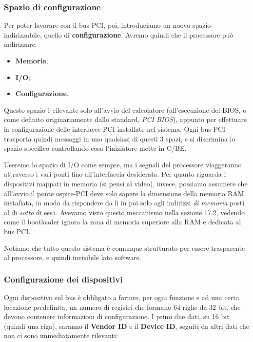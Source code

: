 \documentclass[a4paper,11pt]{article}
\begin{document}
\subsubsection{Spazio di configurazione}
Per poter lavorare con il bus PCI, poi, introduciamo un nuovo spazio indirizzabile, quello di \textbf{configurazione}.
Avremo quindi che il processore può indirizzare:
\begin{itemize}
	\item \textbf{Memoria};
	\item \textbf{I/O};
	\item \textbf{Configurazione}.
\end{itemize}
Questo spazio è rilevante solo all'avvio del calcolatore (all'esecuzione del BIOS, o come definito originariamente dallo standard, \textit{PCI BIOS}), appunto per effettuare la configurazione delle interfacce PCI installate nel sistema.
Ogni bus PCI trasporta quindi messaggi in uno qualsiasi di questi 3 spazi, e si discrimina lo spazio specifico controllando cosa l'iniziatore mette in C/BE.

Useremo lo spazio di I/O come sempre, ma i segnali del processore viaggeranno attraverso i vari ponti fino all'interfaccia desiderata.
Per quanto riguarda i dispositivi mappati in memoria (si pensi al video), invece, possiamo assumere che all'avvio il ponte ospite-PCI deve solo sapere la dimensione della memoria RAM installata, in modo da rispondere da lì in poi solo agli indirizzi \textit{di memoria} posti al di \textit{sotto} di essa.
Avevamo visto questo meccanismo nella sezione 17.2, vedendo come il bootloader ignora la zona di memoria superiore alla RAM e dedicata al bus PCI.

Notiamo che tutto questo sistema è comunque strutturato per essere trasparente al processore, e quindi invisibile lato software.

\subsubsection{Configurazione dei dispositivi}
Ogni dispositivo sul bus è obbligato a fornire, per ogni funzione e ad una certa locazione predefinita, un numero di registri che formano 64 righe da 32 bit, che devono contenere informazioni di configurazione.
I primi due dati, su 16 bit (quindi una riga), saranno il \textbf{Vendor ID} e il \textbf{Device ID}, seguiti da altri dati che non ci sono immediatamente rilevanti:
\end{document}
